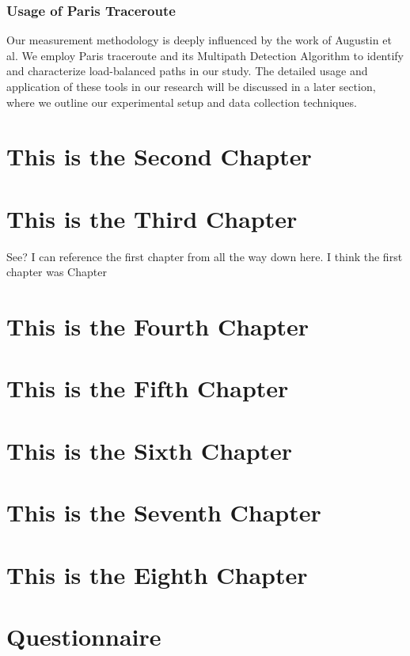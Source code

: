 \documentclass[12pt]{cwru_thesis}
\begin{document}
\subsection{Usage of Paris Traceroute}
Our measurement methodology is deeply influenced by the work of Augustin et al. We employ Paris traceroute and its Multipath Detection Algorithm to identify and characterize load-balanced paths in our study. The detailed usage and application of these tools in our research will be discussed in a later section, where we outline our experimental setup and data collection techniques.


\chapter{This is the Second Chapter}


\chapter{This is the Third Chapter}
See? I can reference the first chapter from all the way down here. I think the first chapter was Chapter

\chapter{This is the Fourth Chapter}
\chapter{This is the Fifth Chapter}
\chapter{This is the Sixth Chapter}
\chapter{This is the Seventh Chapter}
\chapter{This is the Eighth Chapter}


\appendix

\chapter{Questionnaire}

\printbibliography[heading=bibintoc]
\end{document}
